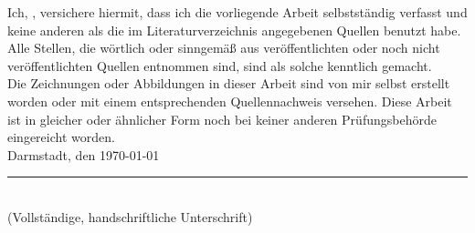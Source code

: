 \documentclass[
11pt, %
english,
singlespacing, %
]{MastersDoctoralThesis} %
\begin{document}
\newpage

\begin{declaration}
\addchaptertocentry{\authorshipname} %
\noindent Ich, \authorname, versichere hiermit, dass ich die vorliegende Arbeit selbstständig verfasst und keine anderen als die im Literaturverzeichnis angegebenen Quellen benutzt habe. \\ 

\noindent Alle Stellen, die wörtlich oder sinngemäß aus veröffentlichten oder noch nicht veröffentlichten Quellen entnommen sind, sind als solche kenntlich gemacht.\\

\noindent Die Zeichnungen oder Abbildungen in dieser Arbeit sind von mir selbst erstellt worden oder mit einem entsprechenden Quellennachweis versehen. Diese Arbeit ist in gleicher oder ähnlicher Form noch bei keiner anderen Prüfungsbehörde eingereicht worden.\\

\noindent Darmstadt, den \today

\vspace{5em}
\noindent\rule[1em]{25em}{0.5pt}\\ %
(Vollständige, handschriftliche Unterschrift)

\end{declaration}

\cleardoublepage
\end{document}
